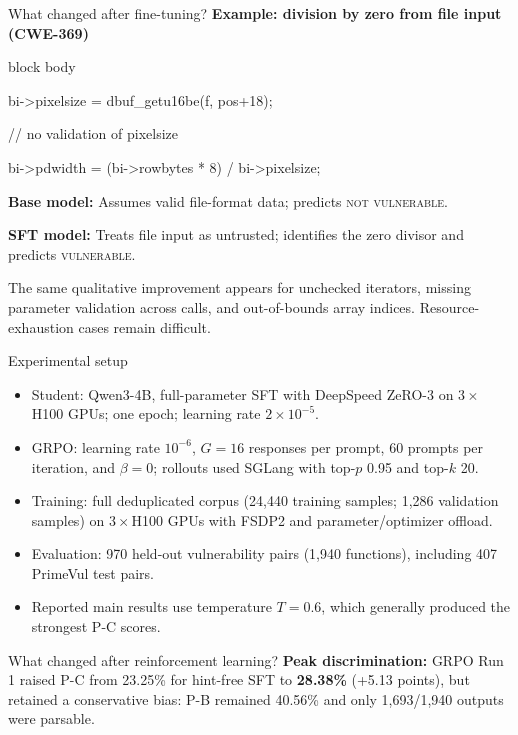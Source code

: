 \documentclass[final]{beamer}
\begin{document}
\begin{frame}[t]
\begin{center}
\begin{minipage}[t]{0.306\textwidth}
\begin{posterblock}{What changed after fine-tuning?}
\textbf{Example: division by zero from file input (CWE-369)}
\vspace{0.25em}
\begin{beamercolorbox}[rounded=true,sep=0.55cm]{block body}
{\ttfamily\fontsize{18}{23}\selectfont
bi->pixelsize = dbuf\_getu16be(f, pos+18);\par
// no validation of pixelsize\par
bi->pdwidth = (bi->rowbytes * 8) / bi->pixelsize;}
\end{beamercolorbox}
\vspace{0.35em}
\textbf{Base model:} Assumes valid file-format data; predicts \textsc{not vulnerable}.\par
\vspace{0.2em}
\textbf{SFT model:} Treats file input as untrusted; identifies the zero divisor and predicts \textsc{vulnerable}.\par
\vspace{0.4em}
The same qualitative improvement appears for unchecked iterators, missing parameter validation across calls, and out-of-bounds array indices. Resource-exhaustion cases remain difficult.
\end{posterblock}

\begin{posterblock}{Experimental setup}
\begin{itemize}
  \item Student: Qwen3-4B, full-parameter SFT with DeepSpeed ZeRO-3 on $3\times$H100 GPUs; one epoch; learning rate $2\times10^{-5}$.
  \item GRPO: learning rate $10^{-6}$, $G=16$ responses per prompt, 60 prompts per iteration, and $\beta=0$; rollouts used SGLang with top-$p$ 0.95 and top-$k$ 20.
  \item Training: full deduplicated corpus (24,440 training samples; 1,286 validation samples) on $3\times$H100 GPUs with FSDP2 and parameter/optimizer offload.
  \item Evaluation: 970 held-out vulnerability pairs (1,940 functions), including 407 PrimeVul test pairs.
  \item Reported main results use temperature $T=0.6$, which generally produced the strongest P-C scores.
\end{itemize}
\end{posterblock}

\begin{posterblock}{What changed after reinforcement learning?}
\textbf{Peak discrimination:} GRPO Run 1 raised P-C from 23.25\% for hint-free SFT to \textbf{28.38\%} (+5.13 points), but retained a conservative bias: P-B remained 40.56\% and only 1,693/1,940 outputs were parsable.


\end{posterblock}
\end{minipage}
\end{center}
\end{frame}
\end{document}
